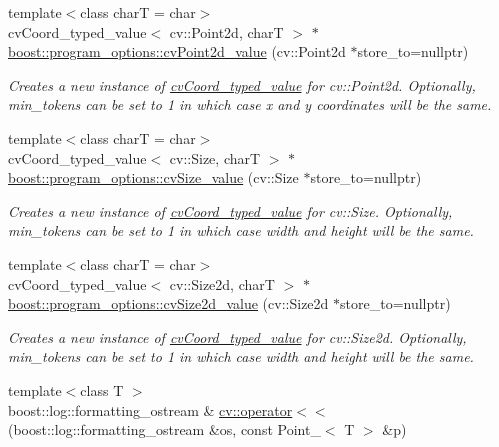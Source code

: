 \begin{DoxyCompactItemize}
{\footnotesize template$<$class charT  = char$>$ }\\cv\+Coord\+\_\+typed\+\_\+value$<$ cv\+::\+Point2d, charT $>$ $\ast$ \hyperlink{group___imagery_module_ga18ab1a2491f19ae825e658aee9ff5f4e}{boost\+::program\+\_\+options\+::cv\+Point2d\+\_\+value} (cv\+::\+Point2d $\ast$store\+\_\+to=nullptr)
\begin{DoxyCompactList}\small\item\em Creates a new instance of \hyperlink{structboost_1_1program__options_1_1cv_coord__typed__value}{cv\+Coord\+\_\+typed\+\_\+value} for cv\+::\+Point2d. Optionally, min\+\_\+tokens can be set to 1 in which case x and y coordinates will be the same. \end{DoxyCompactList}\item 
{\footnotesize template$<$class charT  = char$>$ }\\cv\+Coord\+\_\+typed\+\_\+value$<$ cv\+::\+Size, charT $>$ $\ast$ \hyperlink{group___imagery_module_gae944e0209fb649650a1c5beac4d60fea}{boost\+::program\+\_\+options\+::cv\+Size\+\_\+value} (cv\+::\+Size $\ast$store\+\_\+to=nullptr)
\begin{DoxyCompactList}\small\item\em Creates a new instance of \hyperlink{structboost_1_1program__options_1_1cv_coord__typed__value}{cv\+Coord\+\_\+typed\+\_\+value} for cv\+::\+Size. Optionally, min\+\_\+tokens can be set to 1 in which case width and height will be the same. \end{DoxyCompactList}\item 
{\footnotesize template$<$class charT  = char$>$ }\\cv\+Coord\+\_\+typed\+\_\+value$<$ cv\+::\+Size2d, charT $>$ $\ast$ \hyperlink{group___imagery_module_gad6ef9cef6acd63e1f9d3adcb4e055cf1}{boost\+::program\+\_\+options\+::cv\+Size2d\+\_\+value} (cv\+::\+Size2d $\ast$store\+\_\+to=nullptr)
\begin{DoxyCompactList}\small\item\em Creates a new instance of \hyperlink{structboost_1_1program__options_1_1cv_coord__typed__value}{cv\+Coord\+\_\+typed\+\_\+value} for cv\+::\+Size2d. Optionally, min\+\_\+tokens can be set to 1 in which case width and height will be the same. \end{DoxyCompactList}\item 
{\footnotesize template$<$class T $>$ }\\boost\+::log\+::formatting\+\_\+ostream \& \hyperlink{group___imagery_module_ga4d7a2828ed1d678a96fa0ad0591c4103}{cv\+::operator$<$$<$} (boost\+::log\+::formatting\+\_\+ostream \&os, const Point\+\_\+$<$ T $>$ \&p)

\end{DoxyCompactItemize}

